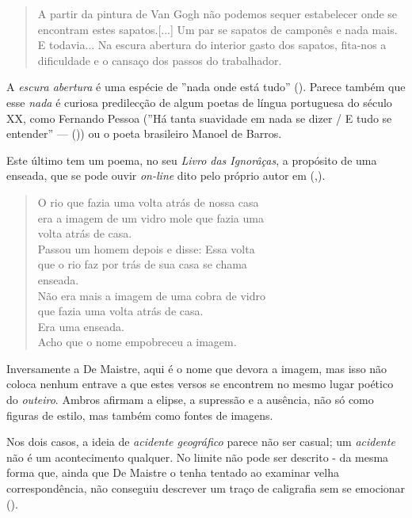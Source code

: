 \documentclass[12pt]{article}
\newenvironment{citacao}
{\begin{quote}
    \begin{small}
      \itshape
      \linespread{1}
}
{\end{small}\end{quote}}
\begin{document}
\singlespacing

\begin{citacao}
  A partir da pintura de Van Gogh não podemos sequer estabelecer onde
  se encontram estes sapatos.[...] Um par se sapatos de camponês e
  nada mais. E todavia...  Na escura abertura do interior gasto dos
  sapatos, fita-nos a dificuldade e o cansaço dos passos do
  trabalhador.
\end{citacao}

\doublespacing

A \emph{escura abertura} é uma espécie de ''nada onde está tudo''
(\cite{jacinto}). Parece também que esse \emph{nada} é curiosa
predilecção de algum poetas de língua portuguesa do século XX, como
Fernando Pessoa (''Há tanta suavidade em nada se dizer / E tudo se
entender'' — (\cite{pessoa})) ou o poeta brasileiro Manoel de Barros.

Este último tem um poema, no seu \emph{Livro das Ignorâças}, a
propósito de uma enseada, que se pode ouvir \emph{on-line} dito pelo
próprio autor em (\cite{vidabreve},\cite{manoel}).

\singlespacing

\begin{citacao}
  O rio que fazia uma volta atrás de nossa casa\\
era a imagem de um vidro mole que fazia uma\\
volta atrás de casa.\\
Passou um homem depois e disse: Essa volta\\
que o rio faz por trás de sua casa se chama\\
enseada.\\
Não era mais a imagem de uma cobra de vidro\\
que fazia uma volta atrás de casa.\\
Era uma enseada.\\

Acho que o nome empobreceu a imagem. \\
\end{citacao}

\doublespacing

Inversamente a De Maistre, aqui é o nome que devora a imagem, mas isso
não coloca nenhum entrave a que estes versos se encontrem no mesmo
lugar poético do \emph{outeiro}. Ambros afirmam a elipse, a supressão
e a ausência, não só como figuras de estilo, mas também como fontes de
imagens.

Nos dois casos, a ideia de \emph{acidente geográfico} parece não ser
casual; um \emph{acidente} não é um acontecimento qualquer. No limite
não pode ser descrito - da mesma forma que, ainda que De Maistre o
tenha tentado ao examinar velha correspondência, não conseguiu
descrever um traço de caligrafia sem se emocionar
(\cite[p.84]{demaistre}).
\end{document}
